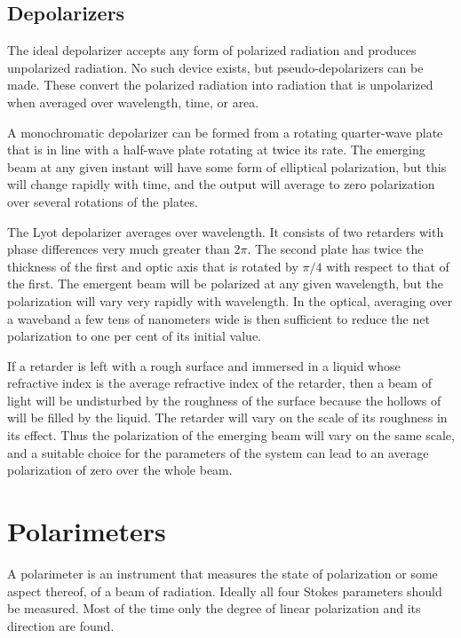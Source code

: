 \subsection{Depolarizers}

The ideal depolarizer accepts any form of polarized radiation and produces unpolarized
radiation. No such device exists, but pseudo-depolarizers can be made. These convert the polarized radiation into radiation that is unpolarized when averaged over wavelength, time, or area. 

A monochromatic depolarizer can be formed from a rotating quarter-wave plate that is in
line with a half-wave plate rotating at twice its rate. The emerging beam at any given instant will have some form of elliptical polarization, but this will change rapidly with time, and the output will average to zero polarization over several rotations of the plates. 

The Lyot depolarizer averages over wavelength. It consists of two retarders with phase differences very much greater than $2\pi$. The second plate has twice the thickness of the first and optic axis that is rotated by $\pi/4$ with respect to that of the first. The emergent beam will be polarized at any given wavelength, but the polarization will vary very rapidly with wavelength. In the optical, averaging over a waveband a few tens of nanometers wide is then sufficient to reduce the net polarization to one per cent of its initial value. 

If a retarder is left with a rough surface and immersed in a liquid whose refractive index is the average refractive index of the retarder, then a beam of light will be undisturbed by the roughness of the surface because the hollows of will be filled by the liquid. The retarder will vary on the scale of its roughness in its effect. Thus the polarization of the emerging beam will vary on the same scale, and a suitable choice for the parameters of the system can lead to an average polarization of zero over the whole beam.

\section{Polarimeters}

A polarimeter is an instrument that measures the state of polarization or some aspect thereof, of a beam of radiation. Ideally all four Stokes parameters should be measured. Most of the time only the degree of linear polarization and its direction are found.

